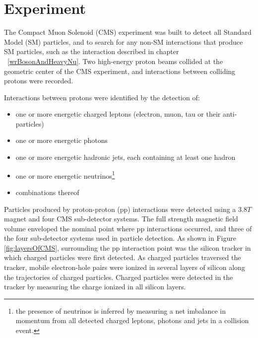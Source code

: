 \chapter{Experiment}
\label{sec:experiment_chapter}
The Compact Muon Solenoid (CMS) experiment was built to detect all Standard Model (SM) particles, and to
search for any non-SM interactions that produce SM particles, such as the interaction described in 
chapter ~\ref{wrBosonAndHeavyNu}.  Two high-energy proton beams collided at the geometric center of
the CMS experiment, and interactions between colliding protons were recorded.

Interactions between protons were identified by the detection of:
\begin{itemize}
	\item one or more energetic charged leptons (electron, muon, tau or their anti-particles)
	\item one or more energetic photons
	\item one or more energetic hadronic jets, each containing at least one hadron
	\item one or more energetic neutrinos\footnote{the presence of neutrinos is inferred by measuring a net imbalance in 
		momentum from all detected charged leptons, photons and jets in a collision event.}
	\item combinations thereof
\end{itemize}
Particles produced by proton-proton (pp) interactions were detected using a 3.8$\unit{T}$ magnet and four CMS 
sub-detector systems.  The full strength magnetic field volume enveloped the nominal point where pp interactions occurred, and three of the four 
sub-detector systems used in particle detection.  As shown in Figure \ref{fig:layersOfCMS}, surrounding the pp interaction
point was the silicon tracker in which charged particles were first detected.  As charged particles traversed
the tracker, mobile electron-hole pairs were ionized in several layers of silicon along the trajectories of charged
particles.  Charged particles were detected in the tracker by measuring the charge ionized in all silicon layers.

